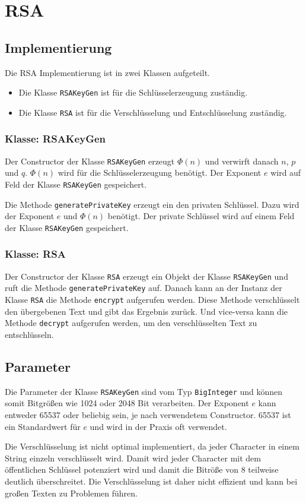 \chapter{RSA}

\section{Implementierung}
Die RSA Implementierung ist in zwei Klassen aufgeteilt.
\begin{itemize}
	\item Die Klasse \texttt{RSAKeyGen} ist für die Schlüsselerzeugung zuständig.
	\item Die Klasse \texttt{RSA} ist für die Verschlüsselung und Entschlüsselung zuständig.
\end{itemize}

\subsection{Klasse: RSAKeyGen}
Der Constructor der Klasse \texttt{RSAKeyGen} erzeugt $\Phi(n)$ und verwirft danach $n$, $p$ und $q$. $\Phi(n)$ wird für die Schlüsselerzeugung benötigt. Der Exponent $e$ wird auf Feld der Klasse \texttt{RSAKeyGen} gespeichert.

Die Methode \texttt{generatePrivateKey} erzeugt ein den privaten Schlüssel. Dazu wird der Exponent $e$ und $\Phi(n)$ benötigt. Der private Schlüssel wird auf einem Feld der Klasse \texttt{RSAKeyGen} gespeichert.

\subsection{Klasse: RSA}
Der Constructor der Klasse \texttt{RSA} erzeugt ein Objekt der Klasse \texttt{RSAKeyGen} und ruft die Methode \texttt{generatePrivateKey} auf.
Danach kann an der Instanz der Klasse \texttt{RSA} die Methode \texttt{encrypt} aufgerufen werden. Diese Methode verschlüsselt den übergebenen Text und gibt das Ergebnis zurück.
Und vice-versa kann die Methode \texttt{decrypt} aufgerufen werden, um den verschlüsselten Text zu entschlüsseln.

\section{Parameter}
Die Parameter der Klasse \texttt{RSAKeyGen} sind vom Typ \texttt{BigInteger} und können somit Bitgrößen wie 1024 oder 2048 Bit verarbeiten. Der Exponent $e$ kann entweder 65537 oder beliebig sein, je nach verwendetem Constructor. 65537 ist ein Standardwert für $e$ und wird in der Praxis oft verwendet.

Die Verschlüsselung ist nicht optimal implementiert, da jeder Character in einem String einzeln verschlüsselt wird. Damit wird jeder Character mit dem öffentlichen Schlüssel potenziert wird und damit die Bitröße von 8 teilweise deutlich überschreitet. Die Verschlüsselung ist daher nicht effizient und kann bei großen Texten zu Problemen führen.